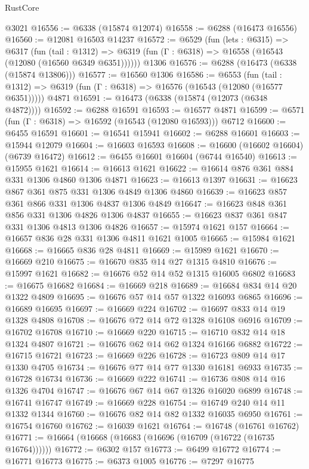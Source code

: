 \begin{lexlean}{RustCore}
\begin{coremodule}
    @3021
@16556 := @6338 (@15874 @12074)
@16558 := @6288 (@16473 @16556)
@16560 := @12081 @16503 @14237
@16572 := @6529
    (fun (lets : @6315) =>
    @6317
      (fun (tail : @1312) =>
      @6319 (fun (Γ : @6318) => @16558 (@16543 (@12080 (@16560 @6349 @6351))))))
    @1306
@16576 := @6288 (@16473 (@6338 (@15874 @13806)))
@16577 := @16560 @1306
@16586 := @6553
    (fun (tail : @1312) => @6319 (fun (Γ : @6318) => @16576 (@16543 (@12080 (@16577 @6351)))))
    @4871
@16591 := @16473 (@6338 (@15874 (@12073 (@6348 @4872))))
@16592 := @6288 @16591
@16593 := @16577 @4871
@16599 := @6571 (fun (Γ : @6318) => @16592 (@16543 (@12080 @16593))) @6712
@16600 := @6455 @16591
@16601 := @16541 @15941
@16602 := @6288 @16601
@16603 := @15944 @12079
@16604 := @16603 @16593
@16608 := @16600 (@16602 @16604) (@6739 @16472)
@16612 := @6455 @16601 @16604 (@6744 @16540)
@16613 := @15955 @1621
@16614 := @16613 @1621
@16622 := @16614 @876 @361 @884 @331 @1306 @4860 @1306 @4871
@16623 := @16613 @1397
@16631 := @16623 @867 @361 @875 @331 @1306 @4849 @1306 @4860
@16639 := @16623 @857 @361 @866 @331 @1306 @4837 @1306 @4849
@16647 := @16623 @848 @361 @856 @331 @1306 @4826 @1306 @4837
@16655 := @16623 @837 @361 @847 @331 @1306 @4813 @1306 @4826
@16657 := @15974 @1621 @157
@16664 := @16657 @836 @28 @331 @1306 @4811 @1621 @1005
@16665 := @15984 @1621
@16668 := @16665 @836 @28 @4811
@16669 := @15989 @1621
@16670 := @16669 @210
@16675 := @16670 @835 @14 @27 @1315 @4810
@16676 := @15997 @1621
@16682 := @16676 @52 @14 @52 @1315 @16005 @6802
@16683 := @16675 @16682
@16684 := @16669 @218
@16689 := @16684 @834 @14 @20 @1322 @4809
@16695 := @16676 @57 @14 @57 @1322 @16093 @6865
@16696 := @16689 @16695
@16697 := @16669 @224
@16702 := @16697 @833 @14 @19 @1328 @4808
@16708 := @16676 @72 @14 @72 @1328 @16108 @6916
@16709 := @16702 @16708
@16710 := @16669 @220
@16715 := @16710 @832 @14 @18 @1324 @4807
@16721 := @16676 @62 @14 @62 @1324 @16166 @6882
@16722 := @16715 @16721
@16723 := @16669 @226
@16728 := @16723 @809 @14 @17 @1330 @4705
@16734 := @16676 @77 @14 @77 @1330 @16181 @6933
@16735 := @16728 @16734
@16736 := @16669 @222
@16741 := @16736 @808 @14 @16 @1326 @4704
@16747 := @16676 @67 @14 @67 @1326 @16020 @6899
@16748 := @16741 @16747
@16749 := @16669 @228
@16754 := @16749 @240 @14 @11 @1332 @1344
@16760 := @16676 @82 @14 @82 @1332 @16035 @6950
@16761 := @16754 @16760
@16762 := @16039 @1621
@16764 := @16748 (@16761 @16762)
@16771 := @16664 (@16668 (@16683 (@16696 (@16709 (@16722 (@16735 @16764))))))
@16772 := @6302 @157
@16773 := @6499 @16772
@16774 := @16771 @16773
@16775 := @6373 @1005
@16776 := @7297 @16775

\end{coremodule}
\end{lexlean}
